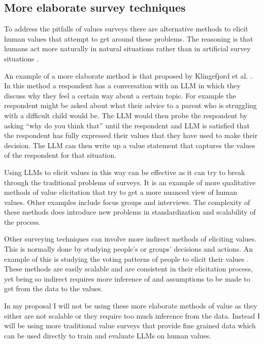 \subsection{More elaborate survey techniques}

To address the pitfalls of values surveys there are alternative methods to elicit human values that attempt to get around these problems. The reasoning is that humans act more naturally in natural situations rather than in artificial survey situations \cite{roethlisbergerManagementWorker1939,brunswikPerceptionRepresentativeDesign1956a}.

An example of a more elaborate method is that proposed by Klingefjord et al. \cite{klingefjordWhatAreHuman2024}. In this method a respondent has a conversation with an LLM in which they discuss why they feel a certain way about a certain topic. For example the respondent might be asked about what their advice to a parent who is struggling with a difficult child would be. The LLM would then probe the respondent by asking ``why do you think that'' until the respondent and LLM is satisfied that the respondent has fully expressed their values that they have used to make their decision. The LLM can then write up a value statement that captures the values of the respondent for that situation.

Using LLMs to elicit values in this way can be effective as it can try to break through the traditional problems of surveys. It is an example of more qualitative methods of value elicitation that try to get a more nuanced view of human values. Other examples include focus groups and interviews. The complexity of these methods does introduce new problems in standardization and scalability of the process.

Other surveying techniques can involve more indirect methods of eliciting values. This is normally done by studying people's or groups' decisions and actions. An example of this is studying the voting patterns of people to elicit their values \cite{lehmannManifestoDataCollection2025}. These methods are easily scalable and are consistent in their elicitation process, yet being so indirect requires more inference of and assumptions to be made to get from the data to the values.

In my proposal I will not be using these more elaborate methods of value as they either are not scalable or they require too much inference from the data. Instead I will be using more traditional value surveys that provide fine grained data which can be used directly to train and evaluate LLMs on human values.

